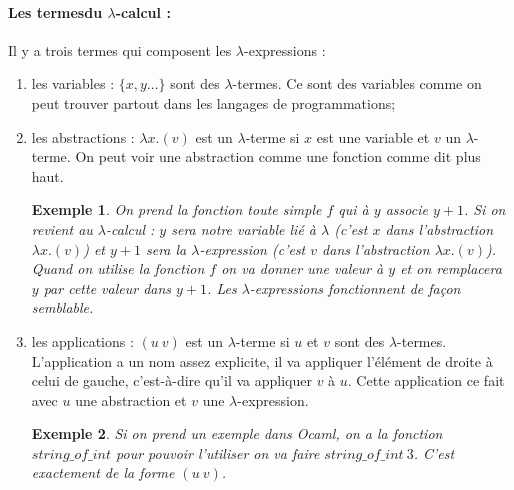 \documentclass[10pt,a4paper]{report}
\newtheorem{ex}{Exemple}
\begin{document}
\paragraph{Les termesdu $\lambda$-calcul :}
 Il y a trois termes qui composent les $\lambda$-expressions :
\begin{enumerate}
\item les variables : $\{x, y...\}$ sont des $\lambda$-termes. Ce sont des variables comme on peut trouver partout dans les langages de programmations; 
\item les abstractions : $\lambda x.(v)$ est un $\lambda$-terme si $x$ est une variable et $v$ un $\lambda$-terme. On peut voir une abstraction comme une fonction comme dit plus haut.
\begin{ex}
	On prend la fonction toute simple $f$ qui à $y$ associe $y+1$. Si on revient au $\lambda$-calcul : $y$ sera notre variable lié à $\lambda$ (c'est $x$ dans l'abstraction $\lambda x.(v)$) et $y+1$ sera la $\lambda$-expression (c'est $v$ dans l'abstraction $\lambda x.(v)$). Quand on utilise la fonction $f$ on va donner une valeur à $y$ et on remplacera $y$ par cette valeur dans $y+1$. Les $\lambda$-expressions fonctionnent de façon semblable.
\end{ex}
\item les applications : $(u~v)$ est un $\lambda$-terme si $u$ et $v$ sont des $\lambda$-termes. L'application a un nom assez explicite, il va appliquer l'élément de droite à celui de gauche, c'est-à-dire qu'il va appliquer $v$ à $u$. Cette application ce fait avec $u$ une abstraction et $v$ une $\lambda$-expression. 
\begin{ex}
	Si on prend un exemple dans Ocaml, on a la fonction $string\_of\_int$ pour pouvoir l'utiliser on va faire $string\_of\_int~3$. C'est exactement de la forme $(u~v)$.  
\end{ex}
\end{enumerate}
\bigbreak
\end{document}
